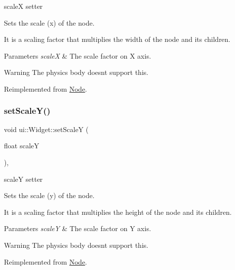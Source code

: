 scaleX setter 

Sets the scale (x) of the node.

It is a scaling factor that multiplies the width of the node and its children.


\begin{DoxyParams}{Parameters}
{\em scaleX} & The scale factor on X axis.\\
\hline
\end{DoxyParams}
\begin{DoxyWarning}{Warning}
The physics body doesn\textquotesingle{}t support this. 
\end{DoxyWarning}


Reimplemented from \hyperlink{classNode_acf7f04074f7f49972e152788c090b877}{Node}.

\mbox{\label{classui_1_1Widget_acac2f88e6a4fb013377bc981a4a10c57}} 
\subsubsection{\texorpdfstring{set\+Scale\+Y()}{setScaleY()}\hspace{0.1cm}{\footnotesize\ttfamily [1/2]}}
{\footnotesize\ttfamily void ui\+::\+Widget\+::set\+ScaleY (\begin{DoxyParamCaption}\item[{float}]{scaleY }\end{DoxyParamCaption})\hspace{0.3cm}{\ttfamily [override]}, {\ttfamily [virtual]}}



scaleY setter 

Sets the scale (y) of the node.

It is a scaling factor that multiplies the height of the node and its children.


\begin{DoxyParams}{Parameters}
{\em scaleY} & The scale factor on Y axis.\\
\hline
\end{DoxyParams}
\begin{DoxyWarning}{Warning}
The physics body doesn\textquotesingle{}t support this. 
\end{DoxyWarning}


Reimplemented from \hyperlink{classNode_aec805a1fa9e8e1038556e468138bb804}{Node}.

